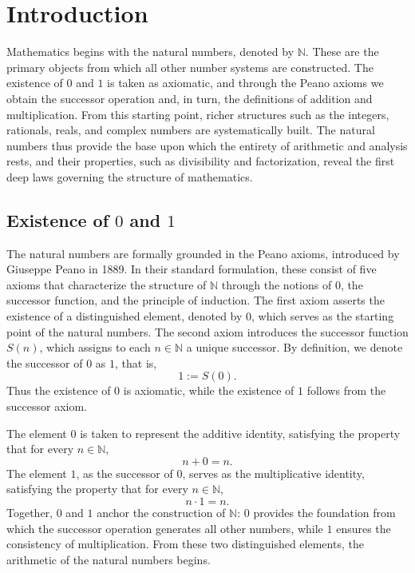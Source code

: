 \documentclass[10pt]{article}
\begin{document}
	
\section*{Introduction}

Mathematics begins with the natural numbers, denoted by $\mathbb{N}$. These are the primary objects from which all other number systems are constructed. The existence of $0$ and $1$ is taken as axiomatic, and through the Peano axioms we obtain the successor operation and, in turn, the definitions of addition and multiplication. From this starting point, richer structures such as the integers, rationals, reals, and complex numbers are systematically built. The natural numbers thus provide the base upon which the entirety of arithmetic and analysis rests, and their properties, such as divisibility and factorization, reveal the first deep laws governing the structure of mathematics.


\subsection*{Existence of $0$ and $1$}

The natural numbers are formally grounded in the Peano axioms, introduced by Giuseppe Peano in 1889. In their standard formulation, these consist of five axioms that characterize the structure of $\mathbb{N}$ through the notions of $0$, the successor function, and the principle of induction. The first axiom asserts the existence of a distinguished element, denoted by $0$, which serves as the starting point of the natural numbers. The second axiom introduces the successor function $S(n)$, which assigns to each $n \in \mathbb{N}$ a unique successor. By definition, we denote the successor of $0$ as $1$, that is, 
$$1 := S(0).$$ 
Thus the existence of $0$ is axiomatic, while the existence of $1$ follows from the successor axiom.

The element $0$ is taken to represent the additive identity, satisfying the property that for every $n \in \mathbb{N}$, 
$$n + 0 = n.$$ 
The element $1$, as the successor of $0$, serves as the multiplicative identity, satisfying the property that for every $n \in \mathbb{N}$, 
$$n \cdot 1 = n.$$ 
Together, $0$ and $1$ anchor the construction of $\mathbb{N}$: $0$ provides the foundation from which the successor operation generates all other numbers, while $1$ ensures the consistency of multiplication. From these two distinguished elements, the arithmetic of the natural numbers begins.
\end{document}

